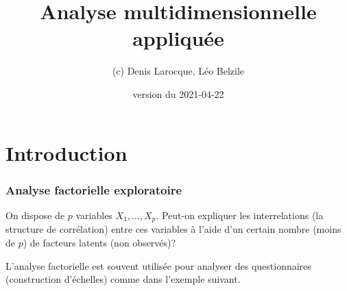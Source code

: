 \documentclass[
  11pt,
  letterpaper,
]{book}
\title{Analyse multidimensionnelle appliquée}
\author{(c) Denis Larocque, Léo Belzile}
\date{version du 2021-04-22}
\theoremstyle{definition}
\theoremstyle{definition}
\theoremstyle{definition}
\theoremstyle{remark}
\begin{document}
\maketitle

{
\setcounter{tocdepth}{1}
\tableofcontents
}
\hypertarget{introduction}{%
\chapter{Introduction}\label{introduction}}

\newcommand{\bs}[1]{\boldsymbol{#1}}
\newcommand{\eps}{\varepsilon}
\newcommand{\Rlang}{\textsf{R}}
\newcommand{\SAS}{\textsf{SAS}}
\newcommand{\Sp}{\mathscr{S}}
\renewcommand{\P}[1]{{\mathsf P}\left(#1\right)}
\newcommand{\E}[1]{{\mathsf E}\left(#1\right)}
\newcommand{\Va}[1]{{\mathsf{Var}}\left(#1\right)}
\newcommand{\Cor}[1]{{\mathsf{Cor}}\left(#1\right)}
\newcommand{\I}[1]{{\mathbf 1}_{#1}}
\newcommand{\expit}{\mathrm{expit}}
\newcommand{\logit}{\mathrm{logit}}
\newcommand{\code}[1]{\texttt{#1}}
\newcommand{\Hy}{\mathcal{H}}
\renewcommand{\d}{\mathrm{d}}

\hypertarget{analyse-factorielle-exploratoire}{%
\subsection{Analyse factorielle exploratoire}\label{analyse-factorielle-exploratoire}}

On dispose de \(p\) variables \(X_1, \ldots, X_p\). Peut-on expliquer les interrelations (la structure de corrélation) entre ces variables à l'aide d'un certain nombre (moins de \(p\)) de facteurs latents (non observés)?

L'analyse factorielle est souvent utilisée pour analyser des questionnaires (construction d'échelles) comme dans l'exemple suivant.
\end{document}
